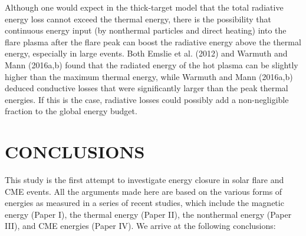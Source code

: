 \documentclass[10pt,preprint]{aastex}  %
\begin{document}
Although one would expect in the thick-target model
that the total radiative energy loss cannot exceed the 
thermal energy, there is the possibility that continuous
energy input (by nonthermal particles and direct heating)
into the flare plasma after the flare peak can boost the
radiative energy above the thermal energy, especially in
large events. Both Emslie et al. (2012) and Warmuth and Mann 
(2016a,b) found that the radiated energy of the hot plasma 
can be slightly higher than the maximum thermal energy,
while Warmuth and Mann (2016a,b) deduced conductive losses that 
were significantly larger than the peak thermal energies.
If this is the case, radiative losses could possibly add
a non-negligible fraction to the global energy budget.

\section{	CONCLUSIONS					}

This study is the first attempt to investigate energy closure in
solar flare and CME events. All the arguments made here are based
on the various forms of energies as measured in a series of recent 
studies, which include the magnetic energy (Paper I), the thermal 
energy (Paper II), the nonthermal energy (Paper III), and CME energies 
(Paper IV). We arrive at the following conclusions:
\end{document}
